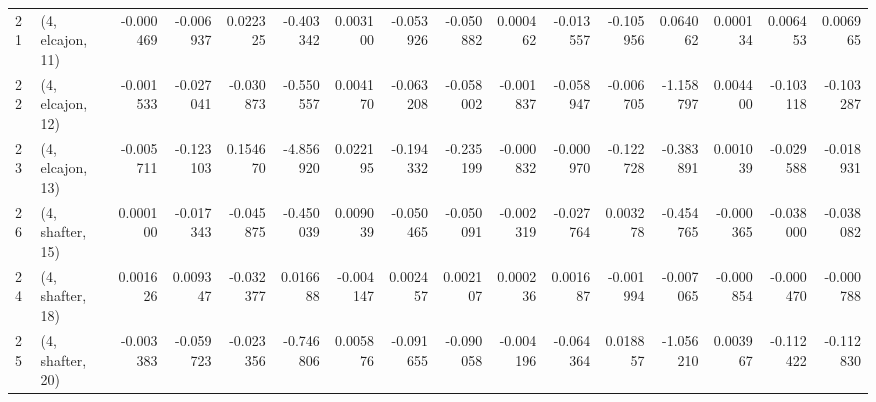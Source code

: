 \begin{tabular}{llrrrrrrrrrrrrrr}
21 &  (4, elcajon, 11) &  -0.000469 & -0.006937 &  0.022325 &  -0.403342 &  0.003100 &  -0.053926 & -0.050882 &  0.000462 & -0.013557 & -0.105956 &   0.064062 &  0.000134 &  0.006453 &  0.006965 \\
22 &  (4, elcajon, 12) &  -0.001533 & -0.027041 & -0.030873 &  -0.550557 &  0.004170 &  -0.063208 & -0.058002 & -0.001837 & -0.058947 & -0.006705 &  -1.158797 &  0.004400 & -0.103118 & -0.103287 \\
23 &  (4, elcajon, 13) &  -0.005711 & -0.123103 &  0.154670 &  -4.856920 &  0.022195 &  -0.194332 & -0.235199 & -0.000832 & -0.000970 & -0.122728 &  -0.383891 &  0.001039 & -0.029588 & -0.018931 \\
26 &  (4, shafter, 15) &   0.000100 & -0.017343 & -0.045875 &  -0.450039 &  0.009039 &  -0.050465 & -0.050091 & -0.002319 & -0.027764 &  0.003278 &  -0.454765 & -0.000365 & -0.038000 & -0.038082 \\
24 &  (4, shafter, 18) &   0.001626 &  0.009347 & -0.032377 &   0.016688 & -0.004147 &   0.002457 &  0.002107 &  0.000236 &  0.001687 & -0.001994 &  -0.007065 & -0.000854 & -0.000470 & -0.000788 \\
25 &  (4, shafter, 20) &  -0.003383 & -0.059723 & -0.023356 &  -0.746806 &  0.005876 &  -0.091655 & -0.090058 & -0.004196 & -0.064364 &  0.018857 &  -1.056210 &  0.003967 & -0.112422 & -0.112830 \\
\bottomrule
\end{tabular}
